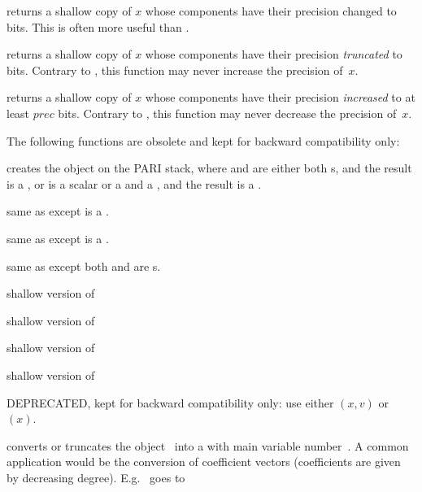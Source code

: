  returns a shallow copy of $x$ whose
 components have their precision changed to  bits.
This is often more useful than .

 returns a shallow copy of $x$ whose
 components have their precision \emph{truncated} to 
bits. Contrary to , this function may never increase
the precision of~$x$.

 returns a shallow copy of $x$ whose
 components have their precision \emph{increased} to at least $prec$
bits. Contrary to , this function may never decrease
the precision of~$x$.

The following functions are obsolete and kept for backward compatibility only:




 creates the object  on
the PARI stack, where  and  are either both s, and the
result is a , or  is a scalar or a  and  a
, and the result is a .

 same as  except  is a
.

 same as  except  is a
.

 same as  except both
 and  are s.

 shallow version of 

 shallow version of 

 shallow version of 

 shallow version of 

 DEPRECATED, kept for backward
compatibility only: use either $(x,v)$ or $(x)$.


 converts or truncates the object~
into a  with main variable number~. A common application
would be the conversion of coefficient vectors (coefficients are given by
decreasing degree). E.g.~\kbd{[2,3]} goes to 

